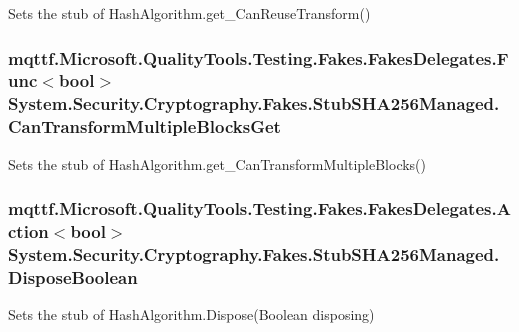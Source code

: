 Sets the stub of Hash\-Algorithm.\-get\-\_\-\-Can\-Reuse\-Transform()

\hypertarget{class_system_1_1_security_1_1_cryptography_1_1_fakes_1_1_stub_s_h_a256_managed_ac4f0504fdef7ff4f51b95f0d2c51efb8}{
\subsubsection[{Can\-Transform\-Multiple\-Blocks\-Get}]{\setlength{\rightskip}{0pt plus 5cm}mqttf.\-Microsoft.\-Quality\-Tools.\-Testing.\-Fakes.\-Fakes\-Delegates.\-Func$<$bool$>$ System.\-Security.\-Cryptography.\-Fakes.\-Stub\-S\-H\-A256\-Managed.\-Can\-Transform\-Multiple\-Blocks\-Get}}\label{class_system_1_1_security_1_1_cryptography_1_1_fakes_1_1_stub_s_h_a256_managed_ac4f0504fdef7ff4f51b95f0d2c51efb8}


Sets the stub of Hash\-Algorithm.\-get\-\_\-\-Can\-Transform\-Multiple\-Blocks()

\hypertarget{class_system_1_1_security_1_1_cryptography_1_1_fakes_1_1_stub_s_h_a256_managed_a542376bb4605c209a806a9ff75d385af}{
\subsubsection[{Dispose\-Boolean}]{\setlength{\rightskip}{0pt plus 5cm}mqttf.\-Microsoft.\-Quality\-Tools.\-Testing.\-Fakes.\-Fakes\-Delegates.\-Action$<$bool$>$ System.\-Security.\-Cryptography.\-Fakes.\-Stub\-S\-H\-A256\-Managed.\-Dispose\-Boolean}}\label{class_system_1_1_security_1_1_cryptography_1_1_fakes_1_1_stub_s_h_a256_managed_a542376bb4605c209a806a9ff75d385af}


Sets the stub of Hash\-Algorithm.\-Dispose(\-Boolean disposing)

